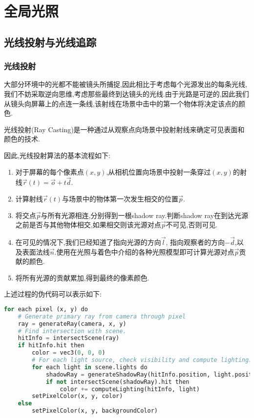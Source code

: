 \documentclass{ctexart}
\begin{document}
\section{全局光照}
\subsection{光线投射与光线追踪}
\subsubsection{光线投射}
大部分环境中的光都不能被镜头所捕捉,因此相比于考虑每个光源发出的每条光线,我们不妨采取逆向思维,考虑那些最终到达镜头的光线.由于光路是可逆的,因此我们从镜头向屏幕上的点连一条线,该射线在场景中击中的第一个物体将决定该点的颜色.
\begin{definition}[光线投射]
    光线投射(Ray Casting)是一种通过从观察点向场景中投射射线来确定可见表面和颜色的技术.
\end{definition}
因此,光线投射算法的基本流程如下:
\begin{enumerate}[label=\tbf{\arabic*.}]
    \item 对于屏幕的每个像素点$(x,y)$,从相机位置向场景中投射一条穿过$(x,y)$的射线$\vec{r}(t)=\vec{o}+t\vec{d}$.
    \item 计算射线$\vec{r}(t)$与场景中的物体第一次发生相交的位置$\vec{p}$.
    \item 将交点$\vec{p}$与所有光源相连,分别得到一根shadow ray.判断shadow ray在到达光源之前是否与其他物体相交,如果相交则该光源对点$\vec{p}$不可见,否则可见.
    \item 在可见的情况下,我们已经知道了指向光源的方向$\vec{l}$, 指向观察者的方向$-\vec{d}$,以及表面法线$\vec{n}$.使用在光照与着色中介绍的各种光照模型即可计算光源对点$\vec{p}$贡献的颜色.
    \item 将所有光源的贡献累加,得到最终的像素颜色.
\end{enumerate}
上述过程的伪代码可以表示如下:
\begin{lstlisting}[language=python]
for each pixel (x, y) do
    # Generate primary ray from camera through pixel
    ray = generateRay(camera, x, y)
    # Find intersection with scene.
    hitInfo = intersectScene(ray)
    if hitInfo.hit then
        color = vec3(0, 0, 0)
        # For each light source, check visibility and compute lighting.
        for each light in scene.lights do
            shadowRay = generateShadowRay(hitInfo.position, light.position)
            if not intersectScene(shadowRay).hit then
                color += computeLighting(hitInfo, light)
        setPixelColor(x, y, color)
    else
        setPixelColor(x, y, backgroundColor)
\end{lstlisting}
\end{document}

